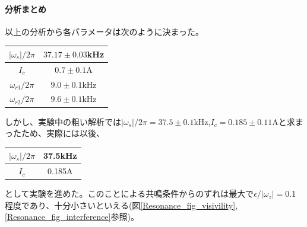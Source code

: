 \clearpage
\paragraph{分析まとめ}
以上の分析から各パラメータは次のように決まった。
\begin{table}[h]
\centering
\begin{tabular}{|c|c|} \hline
$|\omega_s|/2\pi$&$37.17\pm0.03$kHz\\ \hline
$I_c$&$0.7\pm0.1$A \\ \hline
$\omega_{r1}/2\pi$&$9.0\pm0.1$kHz \\ \hline
$\omega_{r2}/2\pi$&$9.6\pm0.1$kHz \\ \hline
\end{tabular}
\end{table}

しかし、実験中の粗い解析では$|\omega_s|/2\pi=37.5\pm0.1$kHz,$I_c=0.185\pm0.11$Aと求まったため、実際には以後、
\begin{table}[h]
\centering
\begin{tabular}{|c|c|} \hline
$|\omega_s|/2\pi$&37.5kHz\\ \hline
$I_c$&0.185A \\ \hline
\end{tabular}
\end{table}

\noindent として実験を進めた。このことによる共鳴条件からのずれは最大で$\epsilon/|\omega_z|=$0.1程度であり、十分小さいといえる(図\ref{Resonance_fig_visivility},\ref{Resonance_fig_interference}参照)。
